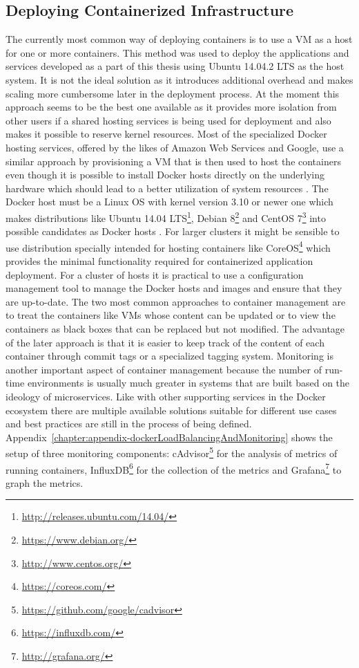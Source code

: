 \subsection{Deploying Containerized Infrastructure}

The currently most common way of deploying containers is to use a VM as a host for one or more containers. This method was used to deploy the applications and services developed as a part of this thesis using Ubuntu 14.04.2 LTS as the host system. It is not the ideal solution as it introduces additional overhead and makes scaling more cumbersome later in the deployment process. At the moment this approach seems to be the best one available as it provides more isolation from other users if a shared hosting services is being used for deployment and also makes it possible to reserve kernel resources. Most of the specialized Docker hosting services, offered by the likes of Amazon Web Services and Google, use a similar approach by provisioning a VM that is then used to host the containers even though it is possible to install Docker hosts directly on the underlying hardware which should lead to a better utilization of system resources \cite{mouat2015docker}.
\newpage
\noindent
The Docker host must be a Linux OS with kernel version 3.10 or newer one which makes distributions like Ubuntu 14.04 LTS\footnote{\url{http://releases.ubuntu.com/14.04/}}, Debian 8\footnote{\url{https://www.debian.org/}} and CentOS 7\footnote{\url{http://www.centos.org/}} into possible candidates as Docker hosts \cite{dockerBinaries}. For larger clusters it might be sensible to use distribution specially intended for hosting containers like CoreOS\footnote{\url{https://coreos.com/}} which provides the minimal functionality required for containerized application deployment. For a cluster of hosts it is practical to use a configuration management tool to manage the Docker hosts and images and ensure that they are up-to-date. The two most common approaches to container management are to treat the containers like VMs whose content can be updated or to view the containers as black boxes that can be replaced but not modified. The advantage of the later approach is that it is easier to keep track of the content of each container through commit tags or a specialized tagging system. Monitoring is another important aspect of container management because the number of run-time environments is usually much greater in systems that are built based on the ideology of microservices. Like with other supporting services in the Docker ecosystem there are multiple available solutions suitable for different use cases and best practices are still in the process of being defined. Appendix~\ref{chapter:appendix-dockerLoadBalancingAndMonitoring} shows the setup of three monitoring components: cAdvisor\footnote{\url{https://github.com/google/cadvisor}} for the analysis of metrics of running containers, InfluxDB\footnote{\url{https://influxdb.com/}} for the collection of the metrics and Grafana\footnote{\url{http://grafana.org/}} to graph the metrics. 

